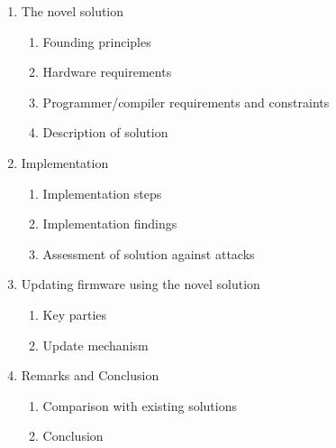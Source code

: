 \documentclass[10pt]{report}
\begin{document}
\begin{enumerate}
	\item The novel solution
		\begin{enumerate}
			\item Founding principles
			\item Hardware requirements
			\item Programmer/compiler requirements and constraints
			\item Description of solution
		\end{enumerate}
	\item Implementation
		\begin{enumerate}
			\item Implementation steps
			\item Implementation findings
			\item Assessment of solution against attacks
		\end{enumerate}
	\item Updating firmware using the novel solution
		\begin{enumerate}
			\item Key parties
			\item Update mechanism
		\end{enumerate}
	\item Remarks and Conclusion
		\begin{enumerate}
			\item Comparison with existing solutions
			\item Conclusion
		\end{enumerate}
\end{enumerate}

\end{document}
